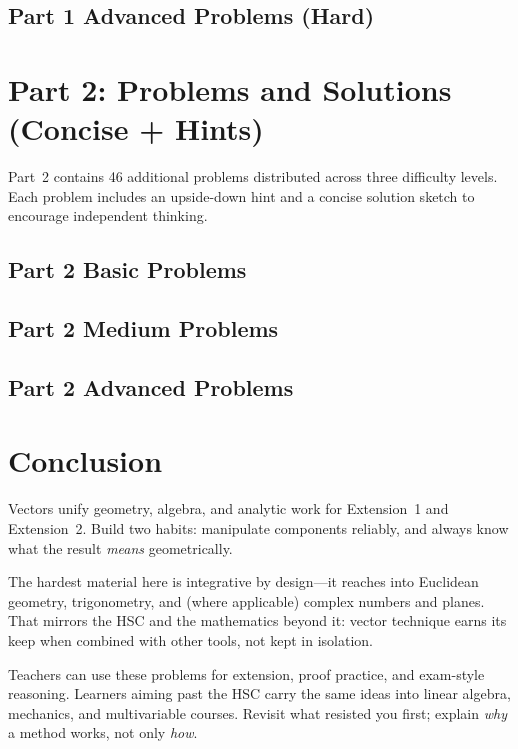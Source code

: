 \documentclass[12pt]{article}
\begin{document}
\subsection{Part 1 Advanced Problems (Hard)}


\section{Part 2: Problems and Solutions (Concise + Hints)}
Part~2 contains 46 additional problems distributed across three difficulty levels. Each problem includes an upside-down hint and a concise solution sketch to encourage independent thinking.

\subsection{Part 2 Basic Problems}


\subsection{Part 2 Medium Problems}


\subsection{Part 2 Advanced Problems}


\section{Conclusion}

Vectors unify geometry, algebra, and analytic work for Extension~1 and Extension~2. Build two habits: manipulate components reliably, and always know what the result \emph{means} geometrically.

The hardest material here is integrative by design---it reaches into Euclidean geometry, trigonometry, and (where applicable) complex numbers and planes. That mirrors the HSC and the mathematics beyond it: vector technique earns its keep when combined with other tools, not kept in isolation.

Teachers can use these problems for extension, proof practice, and exam-style reasoning. Learners aiming past the HSC carry the same ideas into linear algebra, mechanics, and multivariable courses. Revisit what resisted you first; explain \emph{why} a method works, not only \emph{how}.
\end{document}
